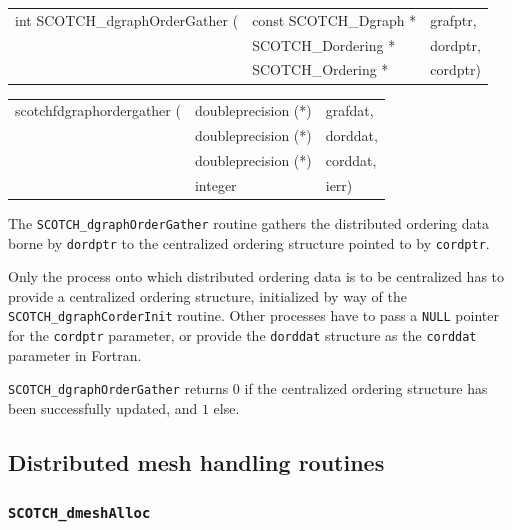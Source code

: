 \begin{itemize}
\progsyn

{\tt\begin{tabular}{l@{}ll}
int SCOTCH\_dgraphOrderGather ( & const SCOTCH\_Dgraph * & grafptr, \\
                                & SCOTCH\_Dordering *    & dordptr, \\
                                & SCOTCH\_Ordering *     & cordptr)
\end{tabular}}

{\tt\begin{tabular}{l@{}ll}
scotchfdgraphordergather ( & doubleprecision (*) & grafdat, \\
                           & doubleprecision (*) & dorddat, \\
                           & doubleprecision (*) & corddat, \\
                           & integer             & ierr)
\end{tabular}}

\progdes

The {\tt SCOTCH\_dgraph\lbt Order\lbt Gather} routine gathers the
distributed ordering data borne by {\tt dordptr} to the
centralized ordering structure pointed to by {\tt cordptr}.

Only the process onto which distributed ordering data is to be
centralized has to provide a centralized ordering structure,
initialized by way of the {\tt SCOTCH\_dgraph\lbt Corder\lbt Init}
routine. Other processes have to pass a \texttt{NULL} pointer for the
\texttt{cordptr} parameter, or provide the \texttt{dorddat} structure
as the \texttt{corddat} parameter in Fortran.

\progret

{\tt SCOTCH\_dgraphOrderGather} returns $0$ if the centralized
ordering structure has been successfully updated, and $1$ else.
\end{itemize}

\subsection{Distributed mesh handling routines}
\label{sec-lib-dmesh}

\subsubsection{\texttt{SCOTCH\_dmeshAlloc}}

